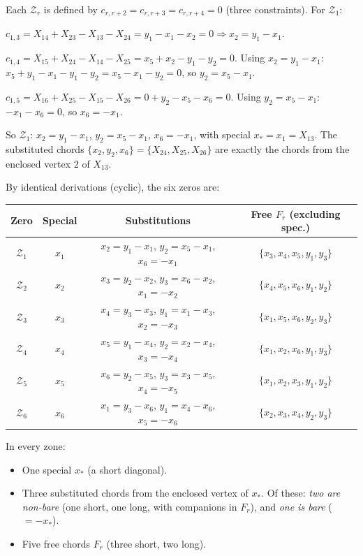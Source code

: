 \documentclass[11pt]{article}
\newcommand{\X}[2]{X_{#1#2}}
\newcommand{\Z}{\mathcal{Z}}
\theoremstyle{definition}
\begin{document}
Each $\Z_r$ is defined by $c_{r,r+2}=c_{r,r+3}=c_{r,r+4}=0$ (three constraints).
For $\Z_1$:

$c_{1,3}=\X{1}{4}+\X{2}{3}-\X{1}{3}-\X{2}{4}=y_1-x_1-x_2=0\Rightarrow x_2=y_1-x_1$.

$c_{1,4}=\X{1}{5}+\X{2}{4}-\X{1}{4}-\X{2}{5}=x_5+x_2-y_1-y_2=0$.
Using $x_2=y_1-x_1$: $x_5+y_1-x_1-y_1-y_2=x_5-x_1-y_2=0$, so $y_2=x_5-x_1$.

$c_{1,5}=\X{1}{6}+\X{2}{5}-\X{1}{5}-\X{2}{6}=0+y_2-x_5-x_6=0$.
Using $y_2=x_5-x_1$: $-x_1-x_6=0$, so $x_6=-x_1$.

So $\Z_1$: $x_2=y_1-x_1$, $y_2=x_5-x_1$, $x_6=-x_1$, with special $x_*=x_1=\X{1}{3}$.
The substituted chords $\{x_2,y_2,x_6\}=\{\X{2}{4},\X{2}{5},\X{2}{6}\}$ are
exactly the chords from the enclosed vertex $2$ of $\X{1}{3}$.

By identical derivations (cyclic), the six zeros are:

\begin{center}
\renewcommand{\arraystretch}{1.2}
\begin{tabular}{c|c|c|c}
\toprule
Zero & Special & Substitutions & Free $F_r$ (excluding spec.)\\
\midrule
$\Z_1$ & $x_1$ & $x_2=y_1-x_1$, $y_2=x_5-x_1$, $x_6=-x_1$ & $\{x_3,x_4,x_5,y_1,y_3\}$\\
$\Z_2$ & $x_2$ & $x_3=y_2-x_2$, $y_3=x_6-x_2$, $x_1=-x_2$ & $\{x_4,x_5,x_6,y_1,y_2\}$\\
$\Z_3$ & $x_3$ & $x_4=y_3-x_3$, $y_1=x_1-x_3$, $x_2=-x_3$ & $\{x_1,x_5,x_6,y_2,y_3\}$\\
$\Z_4$ & $x_4$ & $x_5=y_1-x_4$, $y_2=x_2-x_4$, $x_3=-x_4$ & $\{x_1,x_2,x_6,y_1,y_3\}$\\
$\Z_5$ & $x_5$ & $x_6=y_2-x_5$, $y_3=x_3-x_5$, $x_4=-x_5$ & $\{x_1,x_2,x_3,y_1,y_2\}$\\
$\Z_6$ & $x_6$ & $x_1=y_3-x_6$, $y_1=x_4-x_6$, $x_5=-x_6$ & $\{x_2,x_3,x_4,y_2,y_3\}$\\
\bottomrule
\end{tabular}
\end{center}

In every zone:
\begin{itemize}[nosep,leftmargin=2em]
\item One special $x_*$ (a short diagonal).
\item Three substituted chords from the enclosed vertex of $x_*$. Of these:
  \emph{two are non-bare} (one short, one long, with companions in $F_r$),
  and \emph{one is bare} ($=-x_*$).
\item Five free chords $F_r$ (three short, two long).
\end{itemize}
\end{document}

